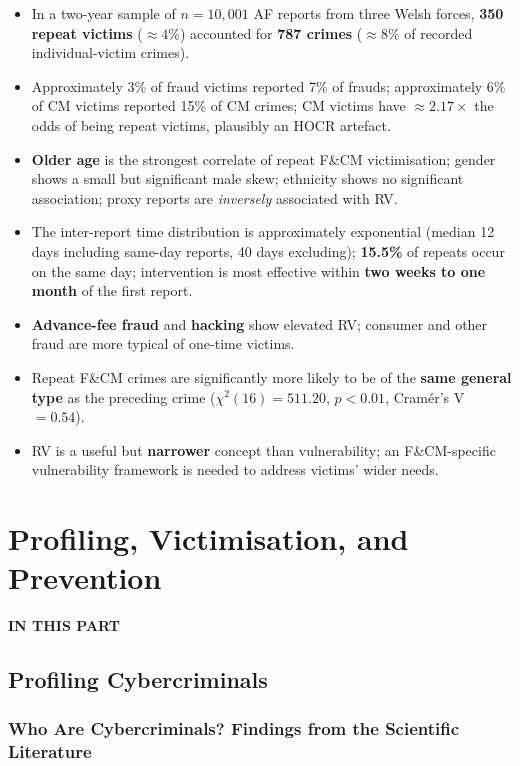 \documentclass[11pt,a4paper,openany]{report}
\theoremstyle{definition}
\theoremstyle{plain}
\theoremstyle{remark}
\newcommand{\partmtoc}{%
  \vspace{2pt}{\color{rlrule}\rule{\linewidth}{0.5pt}}\par\vspace{3pt}%
  {\footnotesize\bfseries\color{rlaccent}IN THIS PART}\par\vspace{2pt}%
  \begingroup\etocsetnexttocdepth{section}\localtableofcontents\endgroup
  \vspace{2pt}{\color{rlrule}\rule{\linewidth}{0.5pt}}\par\vspace{8pt}}
\begin{document}
\begin{itemize}
    \item In a two-year sample of $n = 10{,}001$ AF reports from three Welsh forces, \textbf{350 repeat victims} ($\approx 4\%$) accounted for \textbf{787 crimes} ($\approx 8\%$ of recorded individual-victim crimes).
    \item Approximately 3\% of fraud victims reported 7\% of frauds; approximately 6\% of CM victims reported 15\% of CM crimes; CM victims have $\approx 2.17\times$ the odds of being repeat victims, plausibly an HOCR artefact.
    \item \textbf{Older age} is the strongest correlate of repeat F\&CM victimisation; gender shows a small but significant male skew; ethnicity shows no significant association; proxy reports are \textit{inversely} associated with RV.
    \item The inter-report time distribution is approximately exponential (median 12 days including same-day reports, 40 days excluding); \textbf{15.5\%} of repeats occur on the same day; intervention is most effective within \textbf{two weeks to one month} of the first report.
    \item \textbf{Advance-fee fraud} and \textbf{hacking} show elevated RV; consumer and other fraud are more typical of one-time victims.
    \item Repeat F\&CM crimes are significantly more likely to be of the \textbf{same general type} as the preceding crime ($\chi^2(16) = 511.20$, $p < 0.01$, Cramér's V $= 0.54$).
    \item RV is a useful but \textbf{narrower} concept than vulnerability; an F\&CM-specific vulnerability framework is needed to address victims' wider needs.
\end{itemize}


\part{Profiling, Victimisation, and Prevention}
\partmtoc

\chapter{Profiling Cybercriminals}

\section{Who Are Cybercriminals? Findings from the Scientific Literature}
\end{document}
